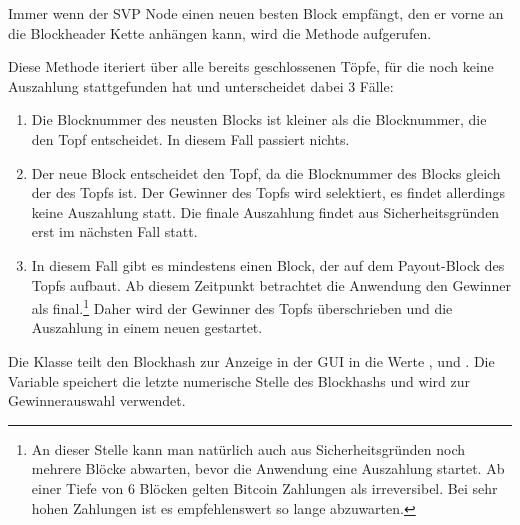 Immer wenn der SVP Node einen neuen besten Block empfängt, den er vorne an die Blockheader Kette anhängen kann, wird die  Methode aufgerufen.


Diese Methode iteriert über alle bereits geschlossenen Töpfe, für die noch keine Auszahlung stattgefunden hat und unterscheidet dabei 3 Fälle:
\begin{enumerate}
\item Die Blocknummer des neusten Blocks ist kleiner als die Blocknummer, die den Topf entscheidet. In diesem Fall passiert nichts.
\item Der neue Block entscheidet den Topf, da die Blocknummer des Blocks gleich der  des Topfs ist. Der Gewinner des Topfs wird selektiert, es findet allerdings keine Auszahlung statt. Die finale Auszahlung findet aus Sicherheitsgründen erst im nächsten Fall statt.
\item In diesem Fall gibt es mindestens einen Block, der auf dem Payout-Block des Topfs aufbaut. Ab diesem Zeitpunkt betrachtet die Anwendung den Gewinner als final.\footnote{An dieser Stelle kann man natürlich auch aus Sicherheitsgründen noch mehrere Blöcke abwarten, bevor die Anwendung eine Auszahlung startet. Ab einer Tiefe von 6 Blöcken gelten Bitcoin Zahlungen als irreversibel. Bei sehr hohen Zahlungen ist es empfehlenswert so lange abzuwarten.} Daher wird der Gewinner des Topfs überschrieben und die Auszahlung in einem neuen  gestartet.
\end{enumerate}

Die Klasse  teilt den Blockhash zur Anzeige in der GUI in die Werte ,  und . Die Variable  speichert die letzte numerische Stelle des Blockhashs und wird zur Gewinnerauswahl verwendet.







